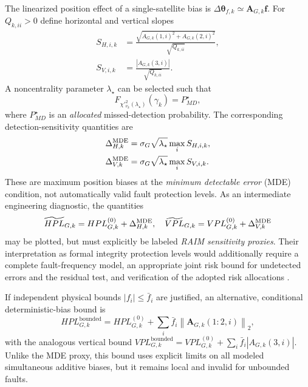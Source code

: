 \documentclass[pdflatex,sn-mathphys-num]{sn-jnl}
\newcommand{\vect}[1]{\boldsymbol{#1}}
\newcommand{\mat}[1]{\mathbf{#1}}
\newcommand{\norm}[1]{\left\lVert #1\right\rVert}
\begin{document}
The linearized position effect of a single-satellite bias is
$\Delta\vect{\theta}_{f,k}\simeq\mat{A}_{G,k}\vect{f}$.
For $Q_{k,ii}>0$ define horizontal and vertical slopes
\begin{align}
 S_{H,i,k}&=\frac{\sqrt{A_{G,k}(1,i)^2+A_{G,k}(2,i)^2}}
 {\sqrt{Q_{k,ii}}},\label{eq:slopeH}\\
 S_{V,i,k}&=\frac{|A_{G,k}(3,i)|}
 {\sqrt{Q_{k,ii}}}.\label{eq:slopeV}
\end{align}
A noncentrality parameter $\lambda_\star$ can be selected such that
\begin{equation}\label{eq:lambda-star}
 F_{\chi'^2_{\nu_k}(\lambda_\star)}(\gamma_k)=P_{MD}^{\star},
\end{equation}
where $P_{MD}^{\star}$ is an \emph{allocated} missed-detection
probability. The corresponding detection-sensitivity quantities are
\begin{align}
 \Delta_{H,k}^{\rm MDE}&=\sigma_G\sqrt{\lambda_\star}
 \max_i S_{H,i,k},\label{eq:raim-Hmde}\\
 \Delta_{V,k}^{\rm MDE}&=\sigma_G\sqrt{\lambda_\star}
 \max_i S_{V,i,k}.\label{eq:raim-Vmde}
\end{align}
These are maximum position biases at the \emph{minimum detectable error}
(MDE) condition, not automatically valid fault protection levels. As an
intermediate engineering diagnostic, the quantities
\begin{equation}\label{eq:raim-proxy}
 \widetilde{HPL}_{G,k}=HPL^{(0)}_{G,k}+\Delta_{H,k}^{\rm MDE},\quad
 \widetilde{VPL}_{G,k}=VPL^{(0)}_{G,k}+\Delta_{V,k}^{\rm MDE}
\end{equation}
may be plotted, but must explicitly be labeled \emph{RAIM sensitivity
proxies}. Their interpretation as formal integrity protection levels
would additionally require a complete fault-frequency model, an
appropriate joint risk bound for undetected errors and the residual test,
and verification of the adopted risk allocations
\cite{Brown1992,WalterEnge1995}.

If independent physical bounds $|f_i|\leq\bar f_i$ are justified,
an alternative, conditional deterministic-bias bound is
\begin{equation}\label{eq:gnss-bounded}
 HPL_{G,k}^{\mathrm{bounded}}
 =HPL_{G,k}^{(0)}+
 \sum_i \bar f_i\norm{\mat{A}_{G,k}(1\!:\!2,i)}_2,
\end{equation}
with the analogous vertical bound
$VPL_{G,k}^{\mathrm{bounded}}=VPL_{G,k}^{(0)}+
\sum_i \bar f_i|A_{G,k}(3,i)|$.
Unlike the MDE proxy, this bound uses explicit limits on all modeled
simultaneous additive biases, but it remains local and invalid for
unbounded faults.
\end{document}
